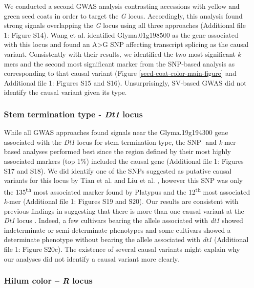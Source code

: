 \documentclass[doublespacing]{bmcart}
\begin{document}
We conducted a second GWAS analysis contrasting accessions with yellow and
green seed coats in order to target the \textit{G} locus. Accordingly, this
analysis found strong signals overlapping the \emph{G} locus using all three
approaches (Additional file 1: Figure S14).
Wang et al. \cite{wang2018} identified Glyma.01g198500 as the gene associated with
this locus and found an A>G SNP affecting transcript splicing as the causal
variant. Consistently with their results, we identified the two
most significant \emph{k}-mers and the second most significant marker from the
SNP-based analysis as corresponding to that causal variant (Figure
\ref{seed-coat-color-main-figure} and Additional file 1: Figures
S15 and
S16). Unsurprisingly, SV-based GWAS
did not identify the causal variant given its type.

\subsubsection*{Stem termination type - \textit{Dt1} locus}

While all GWAS approaches found signals near the Glyma.19g194300 gene
associated with the \textit{Dt1} locus for stem termination type, the SNP- and
\textit{k}-mer-based analyses performed best since the region defined by their
most highly associated markers (top 1\%) included the causal gene (Additional file 1: Figures
S17 and S18).
We did identify one of the SNPs suggested as putative causal variants for this
locus by Tian et al. \cite{tian2010} and Liu et al. \cite{liu2010}, however this SNP was only the
135\textsuperscript{th} most associated marker found by Platypus and the
12\textsuperscript{th} most associated \emph{k}-mer (Additional file 1: Figures
S19 and S20).
Our results are consistent with previous findings in suggesting that there is
more than one causal variant at the \textit{Dt1} locus \citep{liu2010,
tian2010}. Indeed, a few cultivars bearing the allele associated with
\emph{dt1} showed indeterminate or semi-determinate phenotypes and some
cultivars showed a determinate phenotype without bearing the allele associated
with \emph{dt1} (Additional file 1: Figure S20c). The existence of
several causal variants might explain why our analyses did not identify a
causal variant more clearly.

\subsubsection*{Hilum color -- \textit{R} locus}
\end{document}
